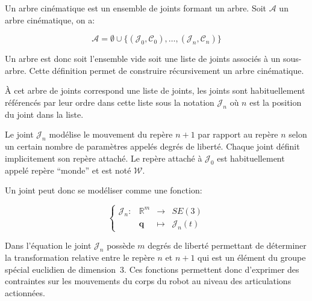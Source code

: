 \begin{mydef}
  Un arbre cinématique est un ensemble de
  joints formant un arbre.  Soit $\mathcal{A}$ un arbre
  cinématique, on a:

  \begin{equation}
    \mathcal{A} = \emptyset \cup \{ (\mathcal{J}_0, \mathcal{C}_0),
    \dotsc, (\mathcal{J}_n, \mathcal{C}_n) \}
  \end{equation}

  Un arbre est donc soit l'ensemble vide soit une liste de joints
  associés à un sous-arbre. Cette définition permet de construire
  récursivement un arbre cinématique.

  À cet arbre de joints correspond une liste de joints, les joints
  sont habituellement référencés par leur ordre dans cette liste sous
  la notation $\mathcal{J}_n$ où $n$ est la position du joint dans la
  liste.
\end{mydef}

\begin{mydef}
  Le joint $\mathcal{J}_n$ modélise le mouvement du repère $n+1$ par
  rapport au repère $n$ selon un certain nombre de paramètres appelés
  degrés de liberté. Chaque joint définit implicitement son repère
  attaché. Le repère attaché à $\mathcal{J}_0$ est habituellement
  appelé repère ``monde'' et est noté $\mathcal{W}$.

  Un joint peut donc se modéliser comme une fonction:

  \begin{equation}
    \left\{
    \begin{array}{cccc}
      \mathcal{J}_n : & \mathbb{R}^m & \rightarrow & SE(3)\\
      & \mathbf{q} & \mapsto & \mathcal{J}_n(t)
    \end{array}
    \right.
  \end{equation}

  Dans l'équation le joint $\mathcal{J}_n$ possède $m$ degrés de
  liberté permettant de déterminer la transformation relative entre le
  repère $n$ et $n + 1$ qui est un élément du groupe spécial euclidien
  de dimension 3. Ces fonctions permettent donc d'exprimer des
  contraintes sur les mouvements du corps du robot au niveau des
  articulations actionnées.
\end{mydef}

